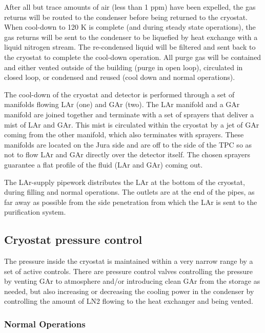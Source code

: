 After all but trace amounts of air (less than 1 ppm) have been expelled, the gas returns will be routed to the condenser before being returned to the cryostat. When cool-down to 120 K is complete (and during steady state operations), the gas returns will be sent to the condenser to be liquefied by heat exchange with a liquid nitrogen stream. The re-condensed liquid will be filtered and sent back to the cryostat to complete the cool-down operation. All purge gas will be contained and either vented outside of the building (purge in open loop), circulated in closed loop, or condensed and reused (cool down and normal operations).

The cool-down of the cryostat and detector is performed through a set of manifolds flowing LAr (one) and GAr (two). The LAr manifold and a GAr manifold are joined together and terminate with a set of sprayers that deliver a mist of LAr and GAr. This mist is circulated within the cryostat by a jet of GAr coming from the other manifold, which also terminates with sprayers. These manifolds are located on the Jura side and are off to the side of the TPC so as not to flow LAr and GAr directly over the detector itself. The chosen sprayers guarantee a flat profile of the fluid (LAr and GAr) coming out.

The LAr-supply pipework distributes the LAr at the bottom of the cryostat, during filling and normal operations. The outlets are at the end of the pipes, as far away as possible from the side penetration from which the LAr is sent to the purification system.

\subsection{Cryostat pressure control}

The pressure inside the cryostat is maintained within a very narrow range by a set of active controls. There are pressure control valves controlling the pressure by venting GAr to atmosphere and/or introducing clean GAr from the storage as needed, but also increasing or decreasing the cooling power in the condenser by controlling the amount of LN2 flowing to the heat exchanger and being vented.

\subsubsection{Normal Operations}

